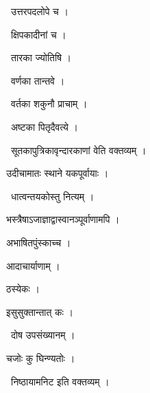 \documentclass[10pt, openany, oneside]{book}
\begin{document}
\par\noindent\hspace{1.5em}{\vps वा॰}~{\qt उत्तरपदलोपे च ।}

\par\noindent\hspace{1.5em}{\vps वा॰}~{\qt क्षिपकादीनां च ।}

\par\noindent\hspace{1.5em}{\vps वा॰}~{\qt तारका ज्योतिषि ।}

\par\noindent\hspace{1.5em}{\vps वा॰}~{\qt वर्णका तान्तवे ।}

\par\noindent\hspace{1.5em}{\vps वा॰}~{\qt वर्तका शकुनौ प्राचाम् ।}

\par\noindent\hspace{1.5em}{\vps वा॰}~{\qt अष्टका पितृदैवत्ये ।}

\par\noindent\hspace{1.5em}{\vps वा॰}~{\qt सूतकापुत्रिकावृन्दारकाणां वेति वक्तव्यम् ।}

\noindent उदीचामातः स्थाने यकपूर्वायाः ।

\par\noindent\hspace{1.5em}{\vps वा॰}~{\qt धात्वन्तयकोस्तु नित्यम् ।}

\noindent भस्त्रैषाऽजाज्ञाद्वास्वानञ्पूर्वाणामपि ।

\noindent अभाषितपुंस्काच्च ।

\noindent आदाचार्याणाम् ।

\noindent ठस्येकः ।

\noindent इसुसुक्तान्तात् कः ।

\par\noindent\hspace{1.5em}{\vps वा॰}~{\qt दोष उपसंख्यानम् ।}

\noindent चजोः कु घिन्ण्यतोः ।

\par\noindent\hspace{1.5em}{\vps वा॰}~{\qt निष्ठायामनिट इति वक्तव्यम् ।}
\end{document}
